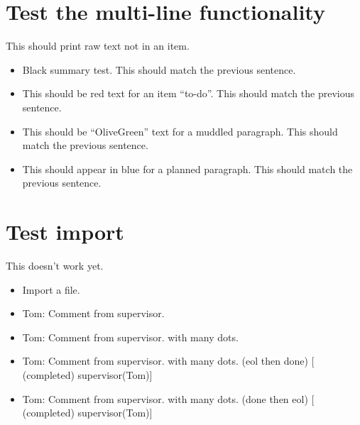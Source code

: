 \chapter{Test the multi-line functionality}
\label{autosec:7}
This should print raw text not in an item.
    \begin{itemize}[noitemsep]
        \item Black summary test.
This should match the previous sentence.
        \item {\color{red}This should be red text for an item ``to-do''.}
{\color{red}This should match the previous sentence.}
        \item {\color{OliveGreen}This should be ``OliveGreen'' text for a muddled paragraph.}
{\color{OliveGreen}This should match the previous sentence.}
        \item {\color{blue}This should appear in blue for a planned paragraph.}
{\color{blue}This should match the previous sentence.}
    \end{itemize}
\chapter{Test import}
\label{autosec:8}
This doesn't work yet.
    \begin{itemize}[noitemsep]
        \item {\color{red}Import a file.}
        \item {\color{WildStrawberry}Tom: Comment from supervisor.}
        \item {\color{WildStrawberry}Tom: Comment from supervisor. with many dots.}
        \item {\color{Gray}Tom: Comment from supervisor. with many dots. (eol then done) [ (completed) supervisor(Tom)]}
        \item {\color{Gray}Tom: Comment from supervisor. with many dots. (done then eol) [ (completed) supervisor(Tom)]}
    \end{itemize}
